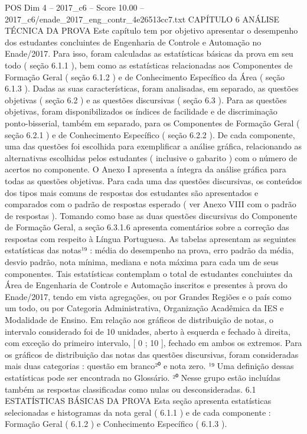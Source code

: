 \begin{textsample}{POS Dim 4 – 2017\_c6 – Score 10.00 – 2017\_c6/enade\_2017\_eng\_contr\_4e26513cc7.txt}  \label{ex:f4_pos_038}
CAPÍTULO 6 ANÁLISE TÉCNICA DA PROVA Este capítulo tem por objetivo apresentar o desempenho dos estudantes concluintes de Engenharia de Controle e Automação no Enade/2017.
Para isso, foram calculadas as estatísticas básicas da prova em seu todo ( seção 6.1.1 ), bem como as estatísticas relacionadas aos Componentes de Formação Geral ( seção 6.1.2 ) e de Conhecimento Específico da Área ( seção 6.1.3 ).
Dadas as suas características, foram analisadas, em separado, as questões objetivas ( seção 6.2 ) e as questões discursivas ( seção 6.3 ).
Para as questões objetivas, foram disponibilizados os índices de facilidade e de discriminação ponto-bisserial, também em separado, para os Componentes de Formação Geral ( seção 6.2.1 ) e de Conhecimento Específico ( seção 6.2.2 ).
De cada componente, uma das questões foi escolhida para exemplificar a análise gráfica, relacionando as alternativas escolhidas pelos estudantes ( inclusive o gabarito ) com o número de acertos no componente.
O Anexo I apresenta a íntegra da análise gráfica para todas as questões objetivas.
Para cada uma das questões discursivas, os conteúdos dos tipos mais comuns de respostas dos estudantes são apresentados e comparados com o padrão de respostas esperado ( ver Anexo VIII com o padrão de respostas ).
Tomando como base as duas questões discursivas do Componente de Formação Geral, a seção 6.3.1.6 apresenta comentários sobre a correção das respostas com respeito à Língua Portuguesa.
As tabelas apresentam as seguintes estatísticas das notas¹⁹ : média do desempenho na prova, erro padrão da média, desvio padrão, nota mínima, mediana e nota máxima para cada um de seus componentes.
Tais estatísticas contemplam o total de estudantes concluintes da Área de Engenharia de Controle e Automação inscritos e presentes à prova do Enade/2017, tendo em vista agregações, ou por Grandes Regiões e o país como um todo, ou por Categoria Administrativa, Organização Acadêmica da IES e Modalidade de Ensino.
Em relação aos gráficos de distribuição de notas, o intervalo considerado foi de 10 unidades, aberto à esquerda e fechado à direita, com exceção do primeiro intervalo, [ 0 ; 10 ], fechado em ambos os extremos.
Para os gráficos de distribuição das notas das questões discursivas, foram consideradas mais duas categorias : questão em branco²⁰ e nota zero. ¹⁹ Uma definição dessas estatísticas pode ser encontrada no Glossário. ²⁰ Nesse grupo estão incluídas também as respostas classificadas como nulas ou desconsideradas. 6.1 ESTATÍSTICAS BÁSICAS DA PROVA Esta seção apresenta estatísticas selecionadas e histogramas da nota geral ( 6.1.1 ) e de cada componente : Formação Geral ( 6.1.2 ) e Conhecimento Específico ( 6.1.3 ).

\end{textsample}
